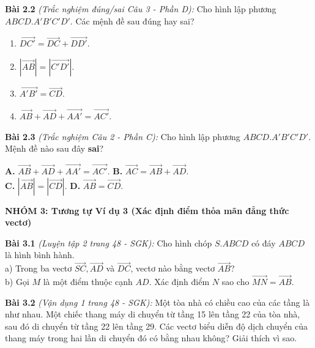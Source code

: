 \documentclass[12pt,a4paper]{article}
\begin{document}
\begin{tcolorbox}[colback=white, colframe=black, title=\textbf{KHỐI 5: BÀI TẬP RÈN LUYỆN TƯƠNG TỰ (Lặp đi lặp lại để khắc sâu)}]
    \textbf{Bài 2.2} \textit{(Trắc nghiệm đúng/sai Câu 3 - Phần D):} Cho hình lập phương \(ABCD.A'B'C'D'\). Các mệnh đề sau đúng hay sai?
    \begin{enumerate}[label=\alph*)]
        \item \(\overrightarrow{DC'} = \overrightarrow{DC} + \overrightarrow{DD'}\).
        \item \(|\overrightarrow{AB}| = |\overrightarrow{C'D'}|\).
        \item \(\overrightarrow{A'B'} = \overrightarrow{CD}\).
        \item \(\overrightarrow{AB} + \overrightarrow{AD} + \overrightarrow{AA'} = \overrightarrow{AC'}\).
    \end{enumerate}
    
    \textbf{Bài 2.3} \textit{(Trắc nghiệm Câu 2 - Phần C):} Cho hình lập phương \(ABCD.A'B'C'D'\). Mệnh đề nào sau đây \textbf{sai}?
    \begin{tcolorbox}[colback=white, colframe=white, top=0pt, bottom=0pt, left=0pt]
        \textbf{A.} \(\overrightarrow{AB} + \overrightarrow{AD} + \overrightarrow{AA'} = \overrightarrow{AC'}\). \hfill \textbf{B.} \(\overrightarrow{AC} = \overrightarrow{AB} + \overrightarrow{AD}\). \\
        \textbf{C.} \(|\overrightarrow{AB}| = |\overrightarrow{CD}|\). \hfill \textbf{D.} \(\overrightarrow{AB} = \overrightarrow{CD}\).
    \end{tcolorbox}
    
    \vspace{0.3cm}
    \textbf{NHÓM 3: Tương tự Ví dụ 3 (Xác định điểm thỏa mãn đẳng thức vectơ)}
    
    \textbf{Bài 3.1} \textit{(Luyện tập 2 trang 48 - SGK):} Cho hình chóp \(S.ABCD\) có đáy \(ABCD\) là hình bình hành. \\
    a) Trong ba vectơ \(\overrightarrow{SC}, \overrightarrow{AD}\) và \(\overrightarrow{DC}\), vectơ nào bằng vectơ \(\overrightarrow{AB}\)? \\
    b) Gọi \(M\) là một điểm thuộc cạnh \(AD\). Xác định điểm \(N\) sao cho \(\overrightarrow{MN} = \overrightarrow{AB}\).
    
    \textbf{Bài 3.2} \textit{(Vận dụng 1 trang 48 - SGK):} Một tòa nhà có chiều cao của các tầng là như nhau. Một chiếc thang máy di chuyển từ tầng 15 lên tầng 22 của tòa nhà, sau đó di chuyển từ tầng 22 lên tầng 29. Các vectơ biểu diễn độ dịch chuyển của thang máy trong hai lần di chuyển đó có bằng nhau không? Giải thích vì sao.
    

\end{tcolorbox}
\end{document}
